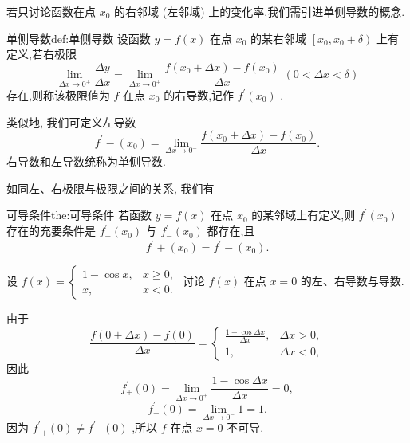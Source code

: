 若只讨论函数在点 \({x}_{0}\) 的右邻域 (左邻域) 上的变化率,我们需引进单侧导数的概念.

\begin{definition}{单侧导数}{def:单侧导数}
设函数 \(y = f\left( x\right)\) 在点 \({x}_{0}\) 的某右邻域 \(\left\lbrack  {{x}_{0},{x}_{0} + \delta }\right)\) 上有定义,若右极限
\[
\mathop{\lim }\limits_{{{\Delta x} \rightarrow  {0}^{ + }}}\frac{\Delta y}{\Delta x} = \mathop{\lim }\limits_{{{\Delta x} \rightarrow  {0}^{ + }}}\frac{f\left( {{x}_{0} + {\Delta x}}\right)  - f\left( {x}_{0}\right) }{\Delta x}\;\left( {0 < {\Delta x} < \delta }\right)
\]
存在,则称该极限值为 \(f\) 在点 \({x}_{0}\) 的右导数,记作 \({f}^{\prime }\left( {x}_{0}\right)\) .

类似地, 我们可定义左导数
\[
{f}^{\prime } - \left( {x}_{0}\right)  = \mathop{\lim }\limits_{{{\Delta x} \rightarrow  {0}^{ - }}}\frac{f\left( {{x}_{0} + {\Delta x}}\right)  - f\left( {x}_{0}\right) }{\Delta x}.
\]
右导数和左导数统称为单侧导数.
\end{definition}


如同左、右极限与极限之间的关系, 我们有

\begin{theorem}{可导条件}{the:可导条件}
若函数 \(y = f\left( x\right)\) 在点 \({x}_{0}\) 的某邻域上有定义,则 \({f}^{\prime }\left( {x}_{0}\right)\) 存在的充要条件是 \({f}_{ + }^{\prime }\left( {x}_{0}\right)\) 与 \({f}_{ - }^{\prime }\left( {x}_{0}\right)\) 都存在,且
\[
{f}^{\prime } + \left( {x}_{0}\right)  = {f}^{\prime } - \left( {x}_{0}\right) .
\]
\end{theorem}

\begin{example}
设 \(f\left( x\right)  = \left\{  \begin{array}{ll} 1 - \cos x, & x \geq  0, \\  x, & x < 0. \end{array}\right.\) 讨论 \(f\left( x\right)\) 在点 \(x = 0\) 的左、右导数与导数.
\end{example}


\begin{solution}
由于
\[
\frac{f\left( {0 + {\Delta x}}\right)  - f\left( 0\right) }{\Delta x} = \left\{  \begin{array}{ll} \frac{1 - \cos {\Delta x}}{\Delta x}, & {\Delta x} > 0, \\  1, & {\Delta x} < 0, \end{array}\right.
\]
因此
\[
{f}_{ + }^{\prime }\left( 0\right)  = \mathop{\lim }\limits_{{{\Delta x} \rightarrow  {0}^{ + }}}\frac{1 - \cos {\Delta x}}{\Delta x} = 0,
\]
\[
{f}_{ - }^{\prime }\left( 0\right)  = \mathop{\lim }\limits_{{{\Delta x} \rightarrow  {0}^{ - }}}1 = 1.
\]
因为 \({f}^{\prime }{}_{ + }\left( 0\right)  \neq  {f}^{\prime }{}_{ - }\left( 0\right)\) ,所以 \(f\) 在点 \(x = 0\) 不可导.
\end{solution}

